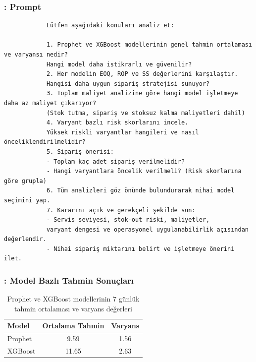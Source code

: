 \documentclass[12pt]{beamer}
\begin{document}
	\begin{frame}[fragile]
		\frametitle{\insertsection: Prompt}
		\scriptsize
		\begin{verbatim}		
			Lütfen aşağıdaki konuları analiz et:
			
			1. Prophet ve XGBoost modellerinin genel tahmin ortalaması ve varyansı nedir?
			Hangi model daha istikrarlı ve güvenilir?
			2. Her modelin EOQ, ROP ve SS değerlerini karşılaştır. 
			Hangisi daha uygun sipariş stratejisi sunuyor?
			3. Toplam maliyet analizine göre hangi model işletmeye daha az maliyet çıkarıyor? 
			(Stok tutma, sipariş ve stoksuz kalma maliyetleri dahil)
			4. Varyant bazlı risk skorlarını incele. 
			Yüksek riskli varyantlar hangileri ve nasıl önceliklendirilmelidir?
			5. Sipariş önerisi:
			- Toplam kaç adet sipariş verilmelidir?
			- Hangi varyantlara öncelik verilmeli? (Risk skorlarına göre grupla)
			6. Tüm analizleri göz önünde bulundurarak nihai model seçimini yap.
			7. Kararını açık ve gerekçeli şekilde sun:
			- Servis seviyesi, stok-out riski, maliyetler, 
			varyant dengesi ve operasyonel uygulanabilirlik açısından değerlendir.
			- Nihai sipariş miktarını belirt ve işletmeye önerini ilet.
		\end{verbatim}
	\end{frame}
	
	\begin{frame}
		\frametitle{\insertsection: Model Bazlı Tahmin Sonuçları}
		\begin{table}
			\centering
			\small
			\begin{tabular}{l c c}
				\toprule
				\textbf{Model} & \textbf{Ortalama Tahmin} &
				\textbf{Varyans}                                 \\
				\midrule
				Prophet        & 9.59                     & 1.56 \\
				XGBoost        & 11.65                    & 2.63 \\
				\bottomrule
			\end{tabular}
			\caption{\small Prophet ve XGBoost modellerinin 7 günlük tahmin
				ortalaması ve varyans değerleri}
		\end{table}
	\end{frame}
	
	
\end{document}

